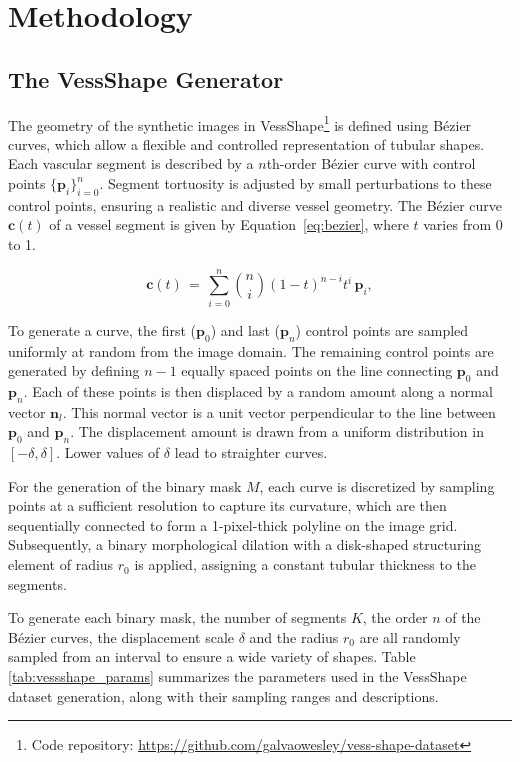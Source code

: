 \documentclass[%
reprint,
nofootinbib,
 amsmath,amssymb,
aps,
superscriptaddress,
showkeys,
longbibliography
]{revtex4-1}
\begin{document}
\section{Methodology}
\label{s:methodology}

\subsection{The VessShape Generator}

The geometry of the synthetic images in VessShape\footnote{{Code repository}: \url{https://github.com/galvaowesley/vess-shape-dataset}} is defined using Bézier curves, which allow a flexible and controlled representation of tubular shapes. Each vascular segment is described by a $n$th-order Bézier curve with control points $\{\mathbf{p}_i\}_{i=0}^n$. Segment tortuosity is adjusted by small perturbations to these control points, ensuring a realistic and diverse vessel geometry. The Bézier curve $\mathbf{c}(t)$ of a vessel segment is given by Equation~\ref{eq:bezier}, where $t$ varies from 0 to 1.

\begin{equation}
\mathbf{c}(t) \,=\, \sum_{i=0}^{n} \binom{n}{i} (1-t)^{n-i} t^{i} \, \mathbf{p}_i,
\label{eq:bezier}
\end{equation}

To generate a curve, the first ($\mathbf{p}_0$) and last ($\mathbf{p}_n$) control points are sampled uniformly at random from the image domain. The remaining control points are generated by defining $n-1$ equally spaced points on the line connecting $\mathbf{p}_0$ and $\mathbf{p}_n$. Each of these points is then displaced by a random amount along a normal vector $\mathbf{n}_l$. This normal vector is a unit vector perpendicular to the line between $\mathbf{p}_0$ and $\mathbf{p}_n$. The displacement amount is drawn from a uniform distribution in $[-\delta,\delta]$. Lower values of $\delta$ lead to straighter curves.

For the generation of the binary mask $M$, each curve is discretized by sampling points at a sufficient resolution to capture its curvature, which are then sequentially connected to form a 1-pixel-thick polyline on the image grid. Subsequently, a binary morphological dilation with a disk-shaped structuring element of radius $r_0$ is applied, assigning a constant tubular thickness to the segments. 

To generate each binary mask, the number of segments $K$, the order $n$ of the Bézier curves, the displacement scale $\delta$ and the radius $r_0$ are all randomly sampled from an interval to ensure a wide variety of shapes. Table \ref{tab:vessshape_params} summarizes the parameters used in the VessShape dataset generation, along with their sampling ranges and descriptions.
\end{document}
